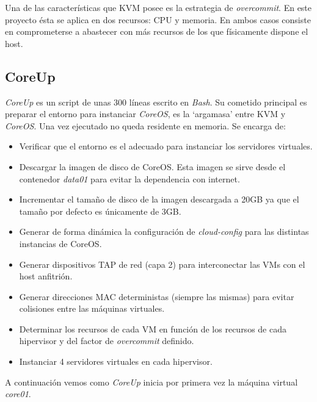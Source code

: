 \documentclass[a4paper,12pt,spanish,final]{epsc_tfc_pfc}
\begin{document}
Una de las características que KVM posee es la estrategia de \emph{overcommit}. En este proyecto ésta se aplica en dos recursos: CPU y memoria. En ambos casos consiste en comprometerse a abastecer con más recursos de los que físicamente dispone el host.

\subsection{CoreUp}

\emph{CoreUp} es un script de unas 300 líneas escrito en \emph{Bash}. Su cometido principal es preparar el entorno para instanciar \emph{CoreOS}, es la `argamasa' entre KVM y \emph{CoreOS}. Una vez ejecutado no queda residente en memoria. Se encarga de:

\begin{itemize}
  \item Verificar que el entorno es el adecuado para instanciar los servidores virtuales.
  \item Descargar la imagen de disco de CoreOS\@. Esta imagen se sirve desde el contenedor \emph{data01} para evitar la dependencia con internet.
  \item Incrementar el tamaño de disco de la imagen descargada a 20GB ya que el tamaño por defecto es únicamente de 3GB.
  \item Generar de forma dinámica la configuración de \emph{cloud-config} para las distintas instancias de CoreOS.
  \item Generar dispositivos TAP de red (capa 2) para interconectar las VMs con el host anfitrión.
  \item Generar direcciones MAC deterministas (siempre las mismas) para evitar colisiones entre las máquinas virtuales.
  \item Determinar los recursos de cada VM en función de los recursos de cada hipervisor y del factor de \emph{overcommit} definido.
  \item Instanciar 4 servidores virtuales en cada hipervisor.
\end{itemize}

A continuación vemos como \emph{CoreUp} inicia por primera vez la máquina virtual \emph{core01}.
\\
\end{document}
